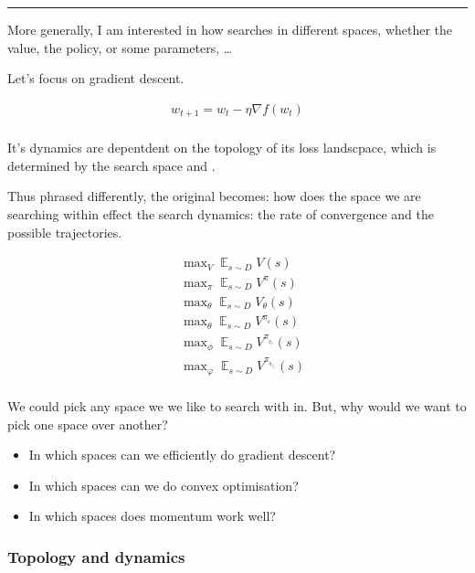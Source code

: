 \begin{center}\rule{0.5\linewidth}{\linethickness}\end{center}

More generally, I am interested in how searches in different spaces,
whether the value, the policy, or some parameters, \ldots{}

Let's focus on gradient descent.

\begin{align}
w_{t+1} = w_t - \eta \nabla f(w_t) \\
\end{align}

It's dynamics are depentdent on the topology of its loss landscpace,
which is determined by the search space and .

Thus phrased differently, the original becomes: how does the space we
are searching within effect the search dynamics: the rate of convergence
and the possible trajectories.

\begin{align}
&\mathop{\text{max}}_V \mathop{\mathbb E}_{s\sim D} V(s) \\
&\mathop{\text{max}}_{\pi} \mathop{\mathbb E}_{s\sim D}V^{\pi}(s) \\
&\mathop{\text{max}}_{\theta} \mathop{\mathbb E}_{s\sim D} V_{\theta}(s) \\
&\mathop{\text{max}}_{\theta} \mathop{\mathbb E}_{s\sim D} V^{\pi_{_{\theta}}}(s) \\
&\mathop{\text{max}}_{\phi} \mathop{\mathbb E}_{s\sim D} V^{\pi_{_{\theta_{\phi}}}}(s) \\
&\mathop{\text{max}}_{\varphi} \mathop{\mathbb E}_{s\sim D} V^{\pi_{_{\theta_{\phi_{\varphi}}}}}(s) \\
\end{align}

We could pick any space we we like to search with in. But, why would we want to pick one space over another?

\begin{itemize}
\tightlist
\item
  In which spaces can we efficiently do gradient descent?
\item
  In which spaces can we do convex optimisation?
\item
  In which spaces does momentum work well?
\end{itemize}

\subsubsection{Topology and dynamics}

